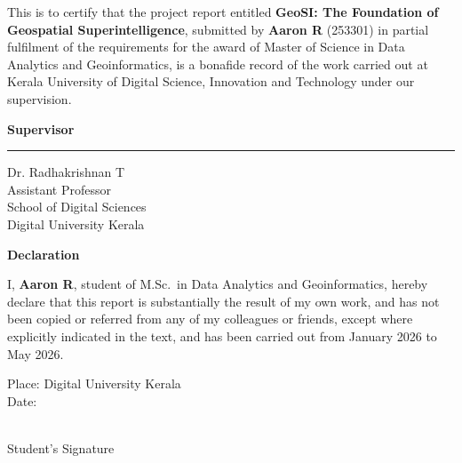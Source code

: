 \documentclass[12pt,a4paper]{report}
\begin{document}
\vspace{2cm}

This is to certify that the project report entitled \textbf{GeoSI: The Foundation of \\Geospatial Superintelligence}, submitted by \textbf{Aaron R} (253301) in partial fulfilment of the requirements for the award of Master of Science in Data Analytics and Geoinformatics, is a bonafide record of the work carried out at Kerala University of Digital Science, Innovation and Technology under our supervision.

\vspace{5cm}

\textbf{Supervisor}

\vspace{2cm}

\rule{6cm}{0.4pt}

\vspace{0.3cm}

Dr. Radhakrishnan T\\
Assistant Professor\\
School of Digital Sciences\\
Digital University Kerala

\newpage

\begin{center}
{\Huge \bfseries Declaration}
\end{center}


\vspace{2cm}

I, \textbf{Aaron R}, student of M.Sc.\ in Data Analytics and Geoinformatics, hereby declare that this report is substantially the result of my own work, and has not been copied or referred from any of my colleagues or friends, except where explicitly indicated in the text, and has been carried out from January 2026 to May 2026.

\vspace{4cm}

\noindent
\begin{minipage}[t]{0.45\textwidth}
Place: Digital University Kerala\\[0.5cm]
Date: \underline{\hspace{3cm}}
\end{minipage}
\hfill
\begin{minipage}[t]{0.35\textwidth}
\centering
\underline{\hspace{5cm}}\\[0.3cm]
Student's Signature
\end{minipage}
\newpage
\end{document}

